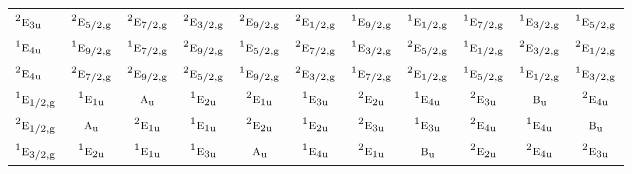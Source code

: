 \documentclass[10pt,a4paper]{article}
\numberwithin{equation}{section}
\newcommand{\irr}[1]{\text{\normalfont\scshape #1}}
\newcommand{\conjpair}[1]{{}^{#1}}
\newcommand{\ptag}[1]{\mathrm{#1}}
\begin{document}
{\begin{longtable}{@{}lcccccccccc@{}}
$\conjpair{2}\irr{e}_{3\ptag{u}}$ & $\conjpair{2}\irr{e}_{5/2,\ptag{g}}$ & $\conjpair{2}\irr{e}_{7/2,\ptag{g}}$ & $\conjpair{2}\irr{e}_{3/2,\ptag{g}}$ & $\conjpair{2}\irr{e}_{9/2,\ptag{g}}$ & $\conjpair{2}\irr{e}_{1/2,\ptag{g}}$ & $\conjpair{1}\irr{e}_{9/2,\ptag{g}}$ & $\conjpair{1}\irr{e}_{1/2,\ptag{g}}$ & $\conjpair{1}\irr{e}_{7/2,\ptag{g}}$ & $\conjpair{1}\irr{e}_{3/2,\ptag{g}}$ & $\conjpair{1}\irr{e}_{5/2,\ptag{g}}$\\
$\conjpair{1}\irr{e}_{4\ptag{u}}$ & $\conjpair{1}\irr{e}_{9/2,\ptag{g}}$ & $\conjpair{1}\irr{e}_{7/2,\ptag{g}}$ & $\conjpair{2}\irr{e}_{9/2,\ptag{g}}$ & $\conjpair{1}\irr{e}_{5/2,\ptag{g}}$ & $\conjpair{2}\irr{e}_{7/2,\ptag{g}}$ & $\conjpair{1}\irr{e}_{3/2,\ptag{g}}$ & $\conjpair{2}\irr{e}_{5/2,\ptag{g}}$ & $\conjpair{1}\irr{e}_{1/2,\ptag{g}}$ & $\conjpair{2}\irr{e}_{3/2,\ptag{g}}$ & $\conjpair{2}\irr{e}_{1/2,\ptag{g}}$\\
$\conjpair{2}\irr{e}_{4\ptag{u}}$ & $\conjpair{2}\irr{e}_{7/2,\ptag{g}}$ & $\conjpair{2}\irr{e}_{9/2,\ptag{g}}$ & $\conjpair{2}\irr{e}_{5/2,\ptag{g}}$ & $\conjpair{1}\irr{e}_{9/2,\ptag{g}}$ & $\conjpair{2}\irr{e}_{3/2,\ptag{g}}$ & $\conjpair{1}\irr{e}_{7/2,\ptag{g}}$ & $\conjpair{2}\irr{e}_{1/2,\ptag{g}}$ & $\conjpair{1}\irr{e}_{5/2,\ptag{g}}$ & $\conjpair{1}\irr{e}_{1/2,\ptag{g}}$ & $\conjpair{1}\irr{e}_{3/2,\ptag{g}}$\\
$\conjpair{1}\irr{e}_{1/2,\ptag{g}}$ & $\conjpair{1}\irr{e}_{1\ptag{u}}$ & $\irr{a}_{\ptag{u}}$ & $\conjpair{1}\irr{e}_{2\ptag{u}}$ & $\conjpair{2}\irr{e}_{1\ptag{u}}$ & $\conjpair{1}\irr{e}_{3\ptag{u}}$ & $\conjpair{2}\irr{e}_{2\ptag{u}}$ & $\conjpair{1}\irr{e}_{4\ptag{u}}$ & $\conjpair{2}\irr{e}_{3\ptag{u}}$ & $\irr{b}_{\ptag{u}}$ & $\conjpair{2}\irr{e}_{4\ptag{u}}$\\
$\conjpair{2}\irr{e}_{1/2,\ptag{g}}$ & $\irr{a}_{\ptag{u}}$ & $\conjpair{2}\irr{e}_{1\ptag{u}}$ & $\conjpair{1}\irr{e}_{1\ptag{u}}$ & $\conjpair{2}\irr{e}_{2\ptag{u}}$ & $\conjpair{1}\irr{e}_{2\ptag{u}}$ & $\conjpair{2}\irr{e}_{3\ptag{u}}$ & $\conjpair{1}\irr{e}_{3\ptag{u}}$ & $\conjpair{2}\irr{e}_{4\ptag{u}}$ & $\conjpair{1}\irr{e}_{4\ptag{u}}$ & $\irr{b}_{\ptag{u}}$\\
$\conjpair{1}\irr{e}_{3/2,\ptag{g}}$ & $\conjpair{1}\irr{e}_{2\ptag{u}}$ & $\conjpair{1}\irr{e}_{1\ptag{u}}$ & $\conjpair{1}\irr{e}_{3\ptag{u}}$ & $\irr{a}_{\ptag{u}}$ & $\conjpair{1}\irr{e}_{4\ptag{u}}$ & $\conjpair{2}\irr{e}_{1\ptag{u}}$ & $\irr{b}_{\ptag{u}}$ & $\conjpair{2}\irr{e}_{2\ptag{u}}$ & $\conjpair{2}\irr{e}_{4\ptag{u}}$ & $\conjpair{2}\irr{e}_{3\ptag{u}}$\\

\end{longtable}}
\end{document}
